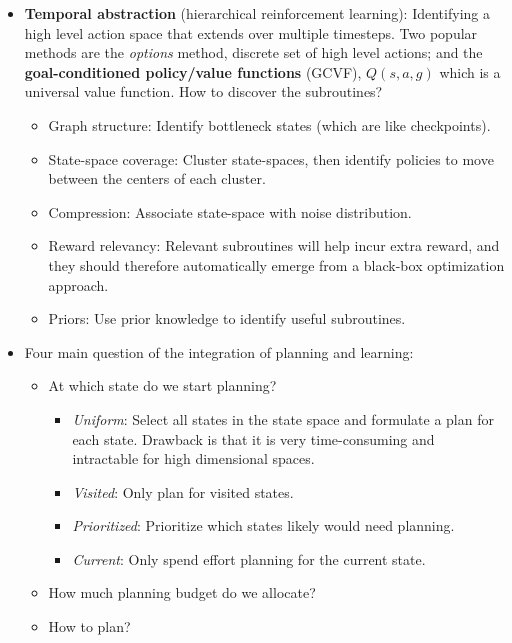 \documentclass{article}
\theoremstyle{plain}
\begin{document}
\begin{itemize}
\begin{itemize}[nolistsep]
        \end{itemize}
    \item \textbf{Temporal abstraction} (hierarchical reinforcement learning): Identifying a high level action space that extends over multiple timesteps. Two popular methods are the \textit{options} method, discrete set of high level actions; and the \textbf{goal-conditioned policy/value functions} (GCVF), $Q(s,a,g)$ which is a universal value function. How to discover the subroutines?
        \begin{itemize}
            \item Graph structure: Identify bottleneck states (which are like checkpoints).
            \item State-space coverage: Cluster state-spaces, then identify policies to move between the centers of each cluster.
            \item Compression: Associate state-space with noise distribution.
            \item Reward relevancy: Relevant subroutines will help incur extra reward, and they should therefore automatically emerge from a black-box optimization approach.
            \item Priors: Use prior knowledge to identify useful subroutines.
        \end{itemize}
    \item Four main question of the integration of planning and learning:
        \begin{itemize}[nolistsep]
            \item At which state do we start planning?
                \begin{itemize}[nolistsep]
                    \item \textit{Uniform}: Select all states in the state space and formulate a plan for each state. Drawback is that it is very time-consuming and intractable for high dimensional spaces.
                    \item \textit{Visited}: Only plan for visited states.
                    \item \textit{Prioritized}: Prioritize which states likely would need planning.
                    \item \textit{Current}: Only spend effort planning for the current state.
                \end{itemize}
            \item How much planning budget do we allocate?
            \item How to plan?

\end{itemize}
\end{itemize}
\end{document}
